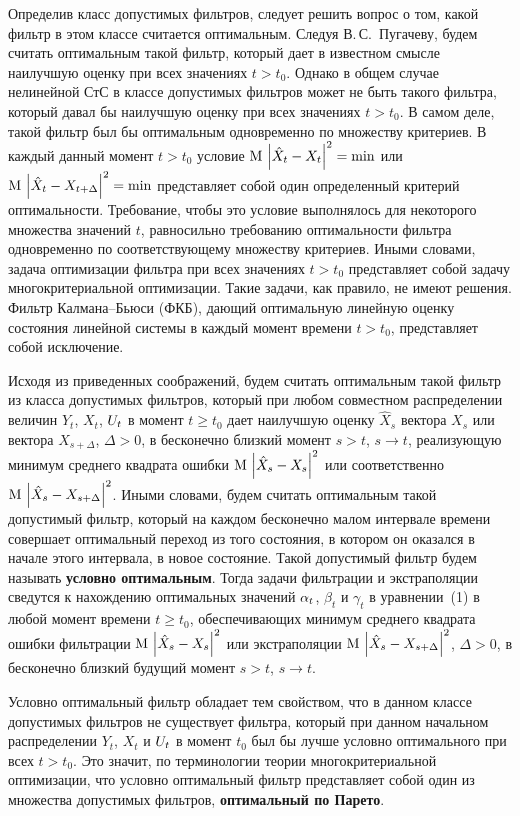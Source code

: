 \begin{multicols}{2}
Определив класс допустимых фильтров, следует решить вопрос о том, какой фильтр 
в этом классе считается оптимальным. Следуя В.\,С.~Пугачеву, будем считать 
оптимальным такой фильтр, который дает в известном смысле наилучшую оценку при 
всех значениях $t>t_0$. Однако в общем случае нелинейной СтС в классе 
допустимых фильтров может не быть такого фильтра, который давал бы наилучшую 
оценку при всех значениях $t>t_0$. В самом деле, такой фильтр был бы 
оптимальным одновременно по множеству критериев. В каждый данный момент $t>t_0$ 
условие  ${\rm M}\,\left\vert\hat X_t  - X_t\right\vert^2 =\min$ или ${\rm M}\,\left\vert\hat X_t  - 
X_{t+\Delta}\right\vert^2 =\min$ представляет собой один определенный критерий 
оптимальности. Требование, чтобы это условие выполнялось для некоторого 
множества значений $t$, равносильно требованию оптимальности фильтра 
одновременно по соответствующему множеству критериев. Иными словами, задача 
оптимизации фильтра при всех значениях $t>t_0$ представляет собой задачу 
многокритериальной оптимизации. Такие задачи, как правило, не имеют решения. 
Фильтр Калмана--Бьюси (ФКБ), дающий оптимальную линейную оценку состояния 
линейной системы в каждый момент времени $t>t_0$, пред\-став\-ля\-ет собой 
исключение.

Исходя из приведенных соображений, будем считать оптимальным такой фильтр из 
класса до\-пус\-ти\-мых фильтров, который при  любом совместном распределении 
величин  $Y_t$, $X_t$, $U_t$ в момент $t\ge t_0$ дает наилучшую оценку  $\hat 
X_s$ вектора  $X_s$ или вектора $X_{s+\Delta}$, $\Delta >0$, в бесконечно 
близкий момент $s> t$, $s\to t$, реализующую минимум среднего квадрата ошибки 
${\rm M}\,\left\vert \hat X_s - X_s\right\vert^2$ или соответственно ${\rm M}\,\left\vert \hat X_s - 
X_{s+\Delta}\right\vert^2$. Иными словами, будем считать оптимальным такой допустимый 
фильтр, который на каждом бесконечно малом интервале времени совершает 
оптимальный переход из того состояния, в котором он оказался в начале этого 
интервала, в новое состояние. Такой допустимый фильтр будем называть  {\bf  
условно оптимальным\/}. Тогда задачи фильтрации и экстраполяции сведутся к 
нахождению оптимальных значений
 $\alpha_t$, $\beta_t$ и  $\gamma_t$ в уравнении~(1) в любой момент
времени $t\ge t_0$, обеспечивающих минимум
среднего квадрата ошибки фильтрации ${\rm M}\,\left\vert \hat X_s -
X_s\right\vert^2$ или экстраполяции ${\rm M}\,\left\vert \hat X_s
-X_{s+\Delta}\right\vert^2$, $\Delta
>0$, в бесконечно близкий будущий момент  $s> t$, $s\to t$.

Условно оптимальный фильтр обладает тем свойством, что в данном
классе допустимых фильтров не существует фильтра, который при
данном начальном распределении  $Y_t$, $X_t$ и  $U_t$ в момент
$t_0$ был бы лучше условно оптимального при всех  $t>t_0$. Это
значит, по терминологии теории многокритериальной оптимизации, что
условно оптимальный фильтр представляет собой один из множества
допустимых фильтров, {\bf оптимальный по Парето\/}.


\end{multicols}
